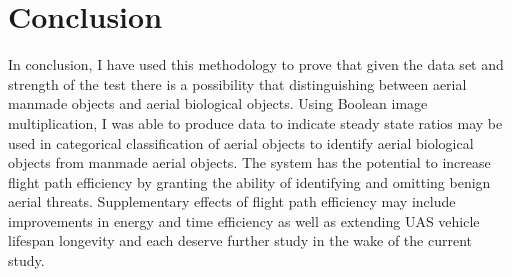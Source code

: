 \section{Conclusion}
\indent In conclusion, I have used this methodology to prove that given the data set and strength of the test there is a possibility that distinguishing between aerial manmade objects and aerial biological objects. Using Boolean image multiplication, I was able to produce data to indicate steady state ratios may be used in categorical classification of aerial objects to identify aerial biological objects from manmade aerial objects. The system has the potential to increase flight path efficiency by granting the ability of identifying and omitting benign aerial threats. Supplementary effects of flight path efficiency may include improvements in energy and time efficiency as well as extending UAS vehicle lifespan longevity and each deserve further study in the wake of the current study. 